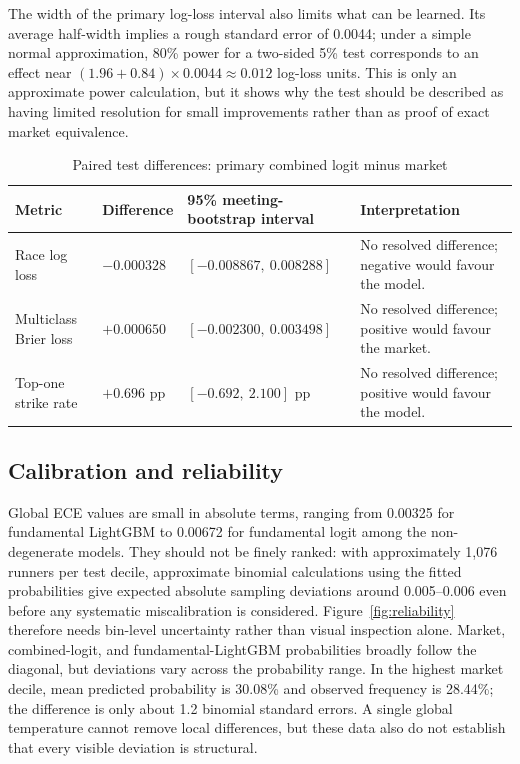 The width of the primary log-loss interval also limits what can be learned. Its average half-width implies a rough standard error of 0.0044; under a simple normal approximation, 80\% power for a two-sided 5\% test corresponds to an effect near $(1.96+0.84)\times0.0044\approx0.012$ log-loss units. This is only an approximate power calculation, but it shows why the test should be described as having limited resolution for small improvements rather than as proof of exact market equivalence.

\begin{table}[htbp]
\centering
\caption{Paired test differences: primary combined logit minus market}\label{tab:paired-differences}
\small
\begin{tabular}{L{3.4cm} R{2.5cm} R{3.5cm} L{3.9cm}}
\toprule
\textbf{Metric} & \textbf{Difference} & \textbf{95\% meeting-bootstrap interval} & \textbf{Interpretation} \\
\midrule
Race log loss & $-0.000328$ & $[-0.008867,\ 0.008288]$ & No resolved difference; negative would favour the model. \\
Multiclass Brier loss & $+0.000650$ & $[-0.002300,\ 0.003498]$ & No resolved difference; positive would favour the market. \\
Top-one strike rate & $+0.696$ pp & $[-0.692,\ 2.100]$ pp & No resolved difference; positive would favour the model. \\
\bottomrule
\end{tabular}
\end{table}

\subsection{Calibration and reliability}\label{sec:results-calibration}
Global ECE values are small in absolute terms, ranging from 0.00325 for fundamental LightGBM to 0.00672 for fundamental logit among the non-degenerate models. They should not be finely ranked: with approximately 1,076 runners per test decile, approximate binomial calculations using the fitted probabilities give expected absolute sampling deviations around 0.005--0.006 even before any systematic miscalibration is considered. Figure~\ref{fig:reliability} therefore needs bin-level uncertainty rather than visual inspection alone. Market, combined-logit, and fundamental-LightGBM probabilities broadly follow the diagonal, but deviations vary across the probability range. In the highest market decile, mean predicted probability is 30.08\% and observed frequency is 28.44\%; the difference is only about 1.2 binomial standard errors. A single global temperature cannot remove local differences, but these data also do not establish that every visible deviation is structural.


